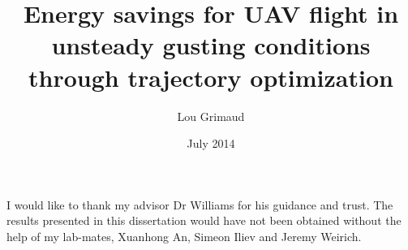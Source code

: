 \documentclass{iitthesis}
\begin{document}
\title{Energy savings for UAV flight in unsteady gusting conditions \\
through trajectory optimization }
\author{Lou Grimaud}
\date{July 2014}
\maketitle                %


\prelimpages         %


\begin{acknowledgement}     %
  \par I would like to thank my advisor Dr Williams for his guidance and trust.
  The results presented in this dissertation would have not been obtained without the help of my lab-mates, Xuanhong An, Simeon Iliev and Jeremy Weirich.

\end{acknowledgement}


\tableofcontents
\clearpage

\listoftables

\clearpage

\listoffigures

\clearpage


\listofsymbols
\end{document}
